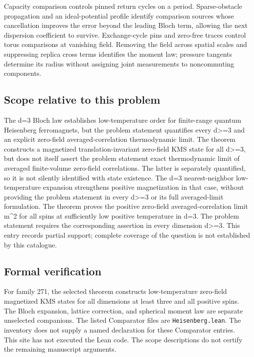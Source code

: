 \documentclass[11pt]{article}
\begin{document}
Capacity comparison controls pinned return cycles on a period. Sparse-obstacle propagation and an ideal-potential profile identify comparison sources whose cancellation improves the error beyond the leading Bloch term, allowing the next dispersion coefficient to survive. Exchange-cycle pins and zero-free traces control torus comparisons at vanishing field. Removing the field across spatial scales and suppressing replica cross terms identifies the moment law; pressure tangents determine its radius without assigning joint measurements to noncommuting components.

\subsection{Scope relative to this problem}
The d=3 Bloch law establishes low-temperature order for finite-range quantum Heisenberg ferromagnets, but the problem statement quantifies every d>=3 and an explicit zero-field averaged-correlation thermodynamic limit. The theorem constructs a magnetized translation-invariant zero-field KMS state for all d>=3, but does not itself assert the problem statement exact thermodynamic limit of averaged finite-volume zero-field correlations. The latter is separately quantified, so it is not silently identified with state existence. The d=3 nearest-neighbor low-temperature expansion strengthens positive magnetization in that case, without providing the problem statement in every d>=3 or its full averaged-limit formulation. The theorem proves the positive zero-field averaged-correlation limit m\textasciicircum{}2 for all spins at sufficiently low positive temperature in d=3. The problem statement requires the corresponding assertion in every dimension d>=3. This entry records partial support; complete coverage of the question is not established by this catalogue.

\subsection{Formal verification}
For family 271, the selected theorem constructs low-temperature zero-field magnetized KMS states for all dimensions at least three and all positive spins. The Bloch expansion, lattice correction, and spherical moment law are separate unselected companions. The listed Comparator files are \texttt{Heisenberg.lean}. The inventory does not supply a named declaration for these Comparator entries. This site has not executed the Lean code. The scope descriptions do not certify the remaining manuscript arguments.
\end{document}
